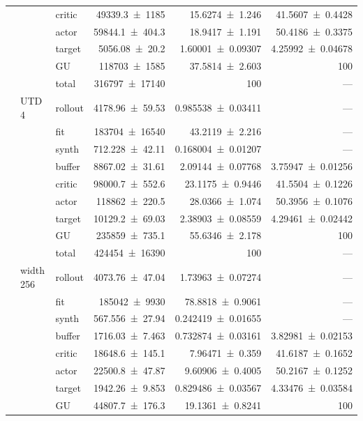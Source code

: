 {\begin{longtable}{@{}lllrrr@{}}
     &  & critic & \num{49339.3+-1185} & \num{15.6274+-1.246} & \num{41.5607+-0.4428} \\
     &  & actor & \num{59844.1+-404.3} & \num{18.9417+-1.191} & \num{50.4186+-0.3375} \\
     &  & target & \num{5056.08+-20.2} & \num{1.60001+-0.09307} & \num{4.25992+-0.04678} \\
     &  & GU & \num{118703+-1585} & \num{37.5814+-2.603} & 100 \\
     &  & total & \num{316797+-17140} & \num{100} & --- \\
    \addlinespace[2pt]
     & UTD 4 & rollout & \num{4178.96+-59.53} & \num{0.985538+-0.03411} & --- \\
     &  & fit & \num{183704+-16540} & \num{43.2119+-2.216} & --- \\
     &  & synth & \num{712.228+-42.11} & \num{0.168004+-0.01207} & --- \\
     &  & buffer & \num{8867.02+-31.61} & \num{2.09144+-0.07768} & \num{3.75947+-0.01256} \\
     &  & critic & \num{98000.7+-552.6} & \num{23.1175+-0.9446} & \num{41.5504+-0.1226} \\
     &  & actor & \num{118862+-220.5} & \num{28.0366+-1.074} & \num{50.3956+-0.1076} \\
     &  & target & \num{10129.2+-69.03} & \num{2.38903+-0.08559} & \num{4.29461+-0.02442} \\
     &  & GU & \num{235859+-735.1} & \num{55.6346+-2.178} & 100 \\
     &  & total & \num{424454+-16390} & \num{100} & --- \\
    \addlinespace[2pt]
     & width 256 & rollout & \num{4073.76+-47.04} & \num{1.73963+-0.07274} & --- \\
     &  & fit & \num{185042+-9930} & \num{78.8818+-0.9061} & --- \\
     &  & synth & \num{567.556+-27.94} & \num{0.242419+-0.01655} & --- \\
     &  & buffer & \num{1716.03+-7.463} & \num{0.732874+-0.03161} & \num{3.82981+-0.02153} \\
     &  & critic & \num{18648.6+-145.1} & \num{7.96471+-0.359} & \num{41.6187+-0.1652} \\
     &  & actor & \num{22500.8+-47.87} & \num{9.60906+-0.4005} & \num{50.2167+-0.1252} \\
     &  & target & \num{1942.26+-9.853} & \num{0.829486+-0.03567} & \num{4.33476+-0.03584} \\
     &  & GU & \num{44807.7+-176.3} & \num{19.1361+-0.8241} & 100 \\

\end{longtable}}
